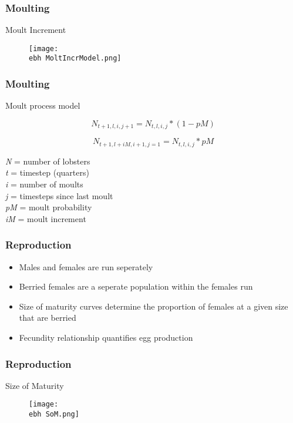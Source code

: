\documentclass{beamer}
\newcommand{\ebh}{/SpinDr/backup/bio_data/bio.lobster/figures/LFA3438Framework2019/Brad/} %
\begin{document}
\begin{frame}
\frametitle{Moulting}
Moult Increment 
\begin{figure}
        \begin{center}
            \texttt{[image: \\ebh MoltIncrModel.png]}
        \end{center}
    \end{figure}
\end{frame}


\begin{frame}
\frametitle{Moulting}
Moult process model 

\begin{equation*}
    N_{t+1, l, i, j+1} = N_{t, l, i, j} * (1 - pM)
\end{equation*}


\begin{equation*}
    N_{t+1, l+iM, i+1, j=1} = N_{t, l, i, j} * pM
\end{equation*}



\textit{N} = number of lobsters\\
\textit{t} = timestep (quarters)\\
\textit{i} = number of moults\\
\textit{j} = timesteps since last moult\\
\textit{pM} = moult probability\\
\textit{iM} = moult increment


\end{frame}



\begin{frame}
\frametitle{Reproduction}
\begin{itemize}
\item Males and females are run seperately
\item Berried females are a seperate population within the females run
\item Size of maturity curves determine the proportion of females at a given size that are berried
\item Fecundity relationship quantifies egg production
\end{itemize}
\end{frame}


\begin{frame}
\frametitle{Reproduction}
Size of Maturity
\begin{figure}
        \begin{center}
            \texttt{[image: \\ebh SoM.png]}
        \end{center}
    \end{figure}
\end{frame}
\end{document}
